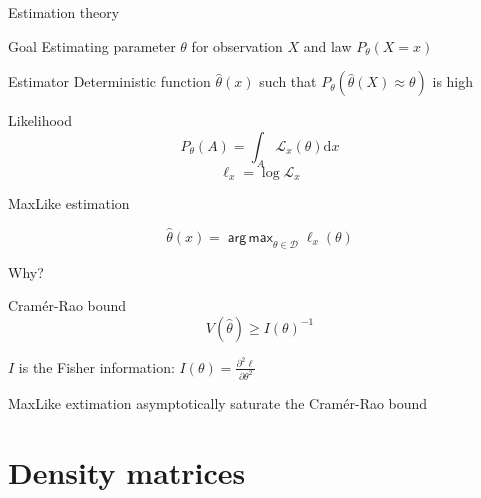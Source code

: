 \documentclass{beamer}
\newcommand{\dd}{\mathrm{d}}
\newcommand{\dparn}[3]{\frac{\partial^{#3} {#1}}{\partial{#2}^{#3}}}
\newcommand{\argmax}{\mathop{\mathsf{arg\,max}}}
\begin{document}
\begin{frame}{Estimation theory}

  \begin{block}{Goal}
    Estimating parameter $\theta$ for observation $X$ and law $P_\theta(X = x)$
  \end{block}

  \pause{}

  \begin{block}{Estimator}
    Deterministic function $\hat \theta(x)$ such that $P_\theta(\hat \theta(X)
    \approx \theta)$ is high
  \end{block}

  \pause{}

  \begin{block}{Likelihood}
    \[P_\theta(A) = \int_A \mathcal{L}_x(\theta) \dd x\]
    \[\ell_x = \log \mathcal{L}_x\]
  \end{block}
  
\end{frame}

\begin{frame}{MaxLike estimation}

  \[\hat \theta(x) = \argmax_{\theta \in \mathcal{D}} \ell_x(\theta)\]

\pause{}

  \begin{center}
    \LARGE Why?
  \end{center}

  \pause{}

  \begin{block}{Cramér-Rao bound}
    \[V(\hat \theta) \geqslant {I(\theta)}^{-1}\]

    $I$ is the Fisher information: $I(\theta) = \dparn \ell \theta 2$
  \end{block}

  \begin{center}
    MaxLike extimation asymptotically \alert{saturate} the Cramér-Rao bound
  \end{center}




\end{frame}



\section{Density matrices}
\end{document}
